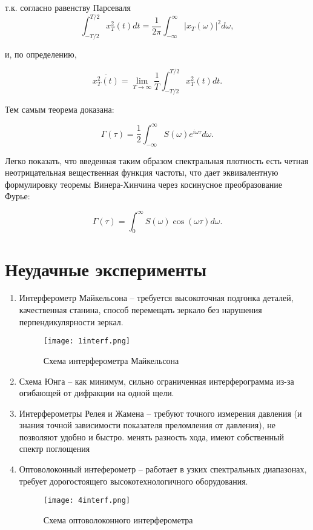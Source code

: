 \documentclass{urticle}
\begin{document}
т.к. согласно равенству Парсеваля
$$ \int_{-T/2}^{T/2} x_T^2(t)dt = \frac{1}{2\pi} \int_{-\infty}^{\infty} |x_T(\omega)|^2 d \omega,$$

и, по определению,

$$
\overline{x_T^2(t)} = \lim\limits_{T\rightarrow\infty} \frac{1}{T} \int_{-T/2}^{T/2} x_T^2(t) dt.$$

Тем самым теорема доказана:

$$\boxed{\Gamma(\tau) = \frac{1}{2}\int_{-\infty}^{\infty} S(\omega) e^{i\omega \tau} d \omega.}$$

Легко показать, что введенная таким образом спектральная плотность есть четная неотрицательная вещественная функция частоты, что дает эквивалентную формулировку теоремы Винера-Хинчина через косинусное преобразование Фурье:

$$\boxed{\Gamma(\tau) = \int_0^\infty S(\omega) \cos(\omega \tau) d\omega.}$$ 


\newpage
\section*{Неудачные эксперименты}
\begin{enumerate}
	\item Интерферометр Майкельсона -- требуется высокоточная подгонка деталей, качественная станина, способ перемещать зеркало без нарушения перпендикулярности зеркал.
	\begin{figure}[H]
	\centering
  	\texttt{[image: 1interf.png]}
  \caption{Схема интерферометра Майкельсона}
  \end{figure}
	\item Схема Юнга -- как минимум, сильно ограниченная интерферограмма из-за огибающей от дифракции на одной щели.
	\item Интерферометры Релея и Жамена -- требуют точного измерения давления (и знания точной зависимости показателя преломления от давления), не позволяют удобно и быстро. менять разность хода, имеют собственный спектр поглощения
	\item Оптоволоконный интеферометр -- работает в узких спектральных диапазонах, требует дорогостоящего высокотехнологичного оборудования.
	\begin{figure}[H]
	\centering
  	\texttt{[image: 4interf.png]}
  \caption{Схема оптоволоконного интерферометра}
  \end{figure}
\end{enumerate}

\newpage
\end{document}
